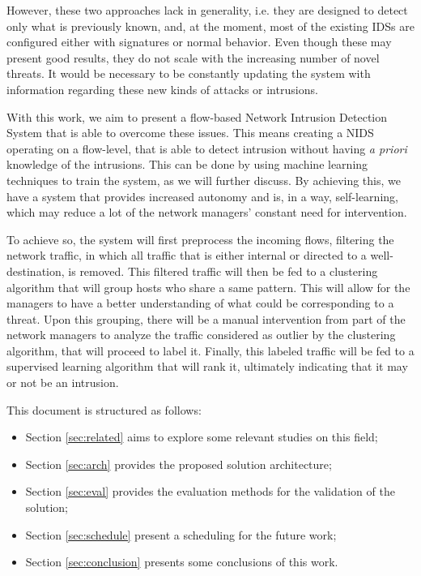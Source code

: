 \documentclass[runningheads,a4paper]{llncs}
\begin{document}
However, these two approaches lack in generality, i.e. they are designed to detect only what is previously known, and, at the moment, most of the existing IDSs are configured either with signatures or normal behavior. Even though these may present good results, they do not scale with the increasing number of novel threats. It would be necessary to be constantly updating the system with information regarding these new kinds of attacks or intrusions.

With this work, we aim to present a flow-based Network Intrusion Detection System that is able to overcome these issues. This means creating a NIDS operating on a flow-level, that is able to detect intrusion without having \textit{a priori} knowledge of the intrusions. This can be done by using machine learning techniques to train the system, as we will further discuss. By achieving this, we have a system that provides increased autonomy and is, in a way, self-learning, which may reduce a lot of the network managers' constant need for intervention.

To achieve so, the system will first preprocess the incoming flows, filtering the network traffic, in which all traffic that is either internal or directed to a well-destination, is removed. This filtered traffic will then be fed to a clustering algorithm that will group hosts who share a same pattern. This will allow for the managers to have a better understanding of what could be corresponding to a threat. Upon this grouping, there will be a manual intervention from part of the network managers to analyze the traffic considered as outlier by the clustering algorithm, that will proceed to label it. Finally, this labeled traffic will be fed to a supervised learning algorithm that will rank it, ultimately indicating that it may or not be an intrusion. 

This document is structured as follows:
\begin{itemize}
\item Section \ref{sec:related} aims to explore some relevant studies on this field;
\item Section \ref{sec:arch} provides the proposed solution architecture;
\item Section \ref{sec:eval} provides the evaluation methods for the validation of the solution;
\item Section \ref{sec:schedule} present a scheduling for the future work;
\item Section \ref{sec:conclusion} presents some conclusions of this work.
\end{itemize}
\end{document}

